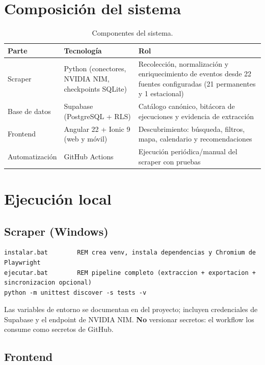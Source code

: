 \documentclass[11pt,a4paper]{article}
\begin{document}
\maketitlecapstone

\section{Composición del sistema}

\begin{table}[h!]
\centering\small
\begin{tabular}{@{}L{3.2cm}L{5.4cm}L{6.2cm}@{}}
\toprule
\textbf{Parte} & \textbf{Tecnología} & \textbf{Rol} \\
\midrule
Scraper & Python (conectores, NVIDIA NIM, checkpoints SQLite) & Recolección, normalización y enriquecimiento de eventos desde 22 fuentes configuradas (21 permanentes y 1 estacional) \\
Base de datos & Supabase (PostgreSQL + RLS) & Catálogo canónico, bitácora de ejecuciones y evidencia de extracción \\
Frontend & Angular 22 + Ionic 9 (web y móvil) & Descubrimiento: búsqueda, filtros, mapa, calendario y recomendaciones \\
Automatización & GitHub Actions & Ejecución periódica/manual del scraper con pruebas \\
\bottomrule
\end{tabular}
\caption{Componentes del sistema.}
\end{table}

\section{Ejecución local}

\subsection{Scraper (Windows)}

\begin{verbatim}
instalar.bat        REM crea venv, instala dependencias y Chromium de Playwright
ejecutar.bat        REM pipeline completo (extraccion + exportacion + sincronizacion opcional)
python -m unittest discover -s tests -v
\end{verbatim}

Las variables de entorno se documentan en  del proyecto;
incluyen credenciales de Supabase y el endpoint de NVIDIA NIM. \textbf{No}
versionar secretos: el workflow los consume como secretos de GitHub.

\subsection{Frontend}
\end{document}
